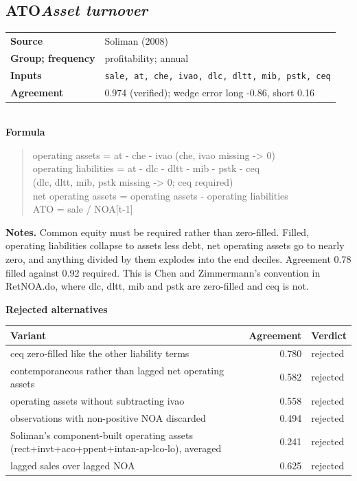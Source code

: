 \documentclass[11pt]{article}
\begin{document}
\subsection*{ATO\quad\normalfont\itshape Asset turnover}
\begin{tabular}{@{}p{3.3cm}p{12.3cm}@{}}
\textbf{Source} & Soliman (2008)\\
\textbf{Group; frequency} & profitability; annual\\
\textbf{Inputs} & \texttt{sale, at, che, ivao, dlc, dltt, mib, pstk, ceq}\\
\textbf{Agreement} & 0.974 (verified); wedge error long -0.86, short 0.16\\
\end{tabular}\\[4pt]
\textbf{Formula}
\begin{quote}\small
operating assets      = at - che - ivao        (che, ivao missing -> 0)\\
operating liabilities = at - dlc - dltt - mib - pstk - ceq\\
                        (dlc, dltt, mib, pstk missing -> 0; ceq required)\\
net operating assets  = operating assets - operating liabilities\\
ATO = sale / NOA[t-1]\\

\end{quote}
\textbf{Notes.} Common equity must be required rather than zero-filled. Filled, operating liabilities collapse to assets less debt, net operating assets go to nearly zero, and anything divided by them explodes into the end deciles. Agreement 0.78 filled against 0.92 required. This is Chen and Zimmermann's convention in RetNOA.do, where dlc, dltt, mib and pstk are zero-filled and ceq is not.


\textbf{Rejected alternatives}\\[2pt]
{\small\begin{longtable}{@{}p{9.6cm}rp{4.3cm}@{}}
\toprule Variant & Agreement & Verdict\\\midrule\endhead
ceq zero-filled like the other liability terms & 0.780 & rejected\\
contemporaneous rather than lagged net operating assets & 0.582 & rejected\\
operating assets without subtracting ivao & 0.558 & rejected\\
observations with non-positive NOA discarded & 0.494 & rejected\\
Soliman's component-built operating assets (rect+invt+aco+ppent+intan-ap-lco-lo), averaged & 0.241 & rejected\\
lagged sales over lagged NOA & 0.625 & rejected\\
\bottomrule\end{longtable}}
\end{document}
